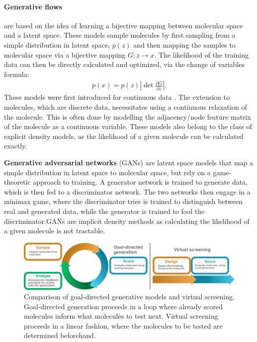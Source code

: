 \paragraph{Generative flows} are based on the idea of learning a bijective mapping between molecular
space and a latent space. These models sample molecules by first sampling from a simple distribution
in latent space, $p(z)$ and then mapping the samples to molecular space via a bijective mapping $G:
      z \rightarrow x$. The likelihood of the training data can then be directly calculated and optimized,
via the change of variables formula:
\begin{align}
      p(x) = p(z) \left| \det \frac{\partial G}{\partial z} \right|.
\end{align}
These models were first introduced for continuous data
\citet{rezendeVariationalInferenceNormalizing2016}. The extension to molecules, which are discrete
data, necessitates using a continuous relaxation of the molecule. This is often done by modelling
the adjacency/node feature matrix of the molecule as a continuous variable. These models also belong
to the class of explicit density models, as the likelihood of a given molecule can be calculated
exactly.

\textbf{Generative adversarial networks} (GANs) \citep{goodfellowGenerativeAdversarialNetworks2014}
are latent space models that map a simple distribution in latent space to molecular space, but rely
on a game-theoretic approach to training. A generator network is trained to generate data, which is
then fed to a discriminator network. The two networks then engage in a minimax game, where the
discriminator tries is trained to distinguish between real and generated data, while the generator
is trained to fool the discriminator.\@ \acp{GAN} are implicit density methods as calculating the
likelihood of a given molecule is not tractable.


\begin{figure}
      \centering
      \includegraphics[width=\textwidth]{./figures/goal_directed_cycle_and_virtual_screening.pdf}
      \caption{Comparison of goal-directed generative models and virtual screening. Goal-directed
            generation proceeds in a loop where already scored molecules inform what molecules to
            test next. Virtual screening proceeds in a linear fashion, where the molecules to be
            tested are determined beforehand. }
\end{figure}


